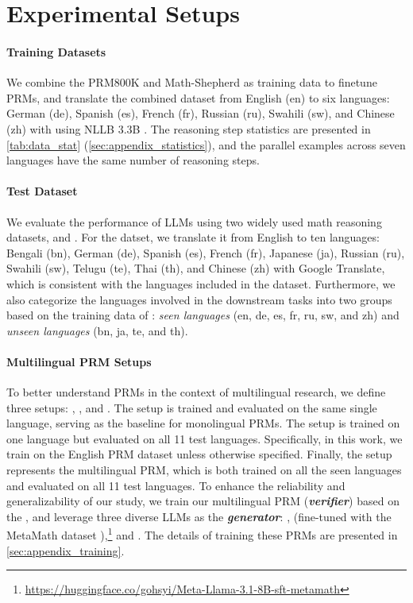 \section{Experimental Setups}
\label{sec:setting}



\paragraph{Training Datasets}
We combine the PRM800K \citep{prm800k} and Math-Shepherd \citep{shepherd} as training data to finetune PRMs, and translate the combined dataset from English (en) to six languages: German (de), Spanish (es), French (fr), Russian (ru), Swahili (sw), and Chinese (zh) with using NLLB 3.3B \citep{nllb}. The reasoning step statistics are presented in \autoref{tab:data_stat} (\autoref{sec:appendix_statistics}), and 
the parallel examples across seven languages have the same number of reasoning steps.

\paragraph{Test Dataset}
We evaluate the performance of LLMs using two widely used math reasoning datasets, \mgsmset \citep{mgsm} and \mathset \citep{shepherd}. For the \mathset datset, we translate it from English to ten languages: Bengali (bn), German (de), Spanish (es), French (fr), Japanese (ja), Russian (ru), Swahili (sw), Telugu (te), Thai (th), and Chinese (zh) with Google Translate, which is consistent with the languages included in the \mgsmset dataset. 
Furthermore, we also categorize the languages involved in the downstream tasks into two groups based on the training data of \prm: \textit{seen languages} (en, de, es, fr, ru, sw, and zh) and \textit{unseen languages} (bn, ja, te, and th).

\paragraph{Multilingual PRM Setups}
To better understand PRMs in the context of multilingual research, we define three setups: \mono, \en, and \mix. The \mono setup is trained and evaluated on the same single language, serving as the baseline for monolingual PRMs. The \en setup is trained on one language but evaluated on all 11 test languages. Specifically, in this work, we train \en on the English PRM dataset unless otherwise specified. Finally, the \mix setup represents the multilingual PRM, which is both trained on all the seen languages and evaluated on all 11 test languages. To enhance the reliability and generalizability of our study, we train our multilingual PRM (\textbf{\textit{verifier}}) based on the \qwen \citep{qwen}, 
and leverage three diverse LLMs as the \textbf{\textit{generator}}: \mistral \citep{metamath}, 
\llama (fine-tuned with the MetaMath dataset \citep{llama}),\footnote{\url{https://huggingface.co/gohsyi/Meta-Llama-3.1-8B-sft-metamath}}
and \deepseek \citep{deepseek}. 
The details of training these PRMs are presented in \autoref{sec:appendix_training}.

